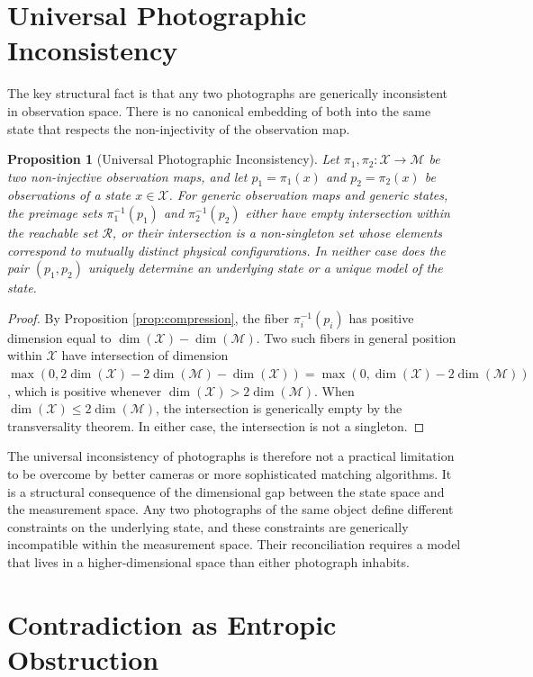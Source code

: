 \documentclass[12pt, a4paper, oneside]{article}
\theoremstyle{plain}
\newtheorem{proposition}[theorem]{Proposition}
\theoremstyle{definition}
\theoremstyle{remark}
\newcommand{\X}{\mathcal{X}}
\newcommand{\M}{\mathcal{M}}
\newcommand{\R}{\mathcal{R}}
\newcommand{\proj}{\pi}
\begin{document}
\section{Universal Photographic Inconsistency}

The key structural fact is that any two photographs are generically inconsistent in observation space. There is no canonical embedding of both into the same state that respects the non-injectivity of the observation map.

\begin{proposition}[Universal Photographic Inconsistency]
\label{prop:photo-inconsistency}
Let $\proj_1, \proj_2 : \X \to \M$ be two non-injective observation maps, and let $p_1 = \proj_1(x)$ and $p_2 = \proj_2(x)$ be observations of a state $x \in \X$. For generic observation maps and generic states, the preimage sets $\proj_1^{-1}(p_1)$ and $\proj_2^{-1}(p_2)$ either have empty intersection within the reachable set $\R$, or their intersection is a non-singleton set whose elements correspond to mutually distinct physical configurations. In neither case does the pair $(p_1, p_2)$ uniquely determine an underlying state or a unique model of the state.
\end{proposition}

\begin{proof}
By Proposition \ref{prop:compression}, the fiber $\proj_i^{-1}(p_i)$ has positive dimension equal to $\dim(\X) - \dim(\M)$. Two such fibers in general position within $\X$ have intersection of dimension $\max(0, 2\dim(\X) - 2\dim(\M) - \dim(\X)) = \max(0, \dim(\X) - 2\dim(\M))$, which is positive whenever $\dim(\X) > 2\dim(\M)$. When $\dim(\X) \leq 2\dim(\M)$, the intersection is generically empty by the transversality theorem. In either case, the intersection is not a singleton.
\end{proof}

The universal inconsistency of photographs is therefore not a practical limitation to be overcome by better cameras or more sophisticated matching algorithms. It is a structural consequence of the dimensional gap between the state space and the measurement space. Any two photographs of the same object define different constraints on the underlying state, and these constraints are generically incompatible within the measurement space. Their reconciliation requires a model that lives in a higher-dimensional space than either photograph inhabits.

\section{Contradiction as Entropic Obstruction}
\end{document}
